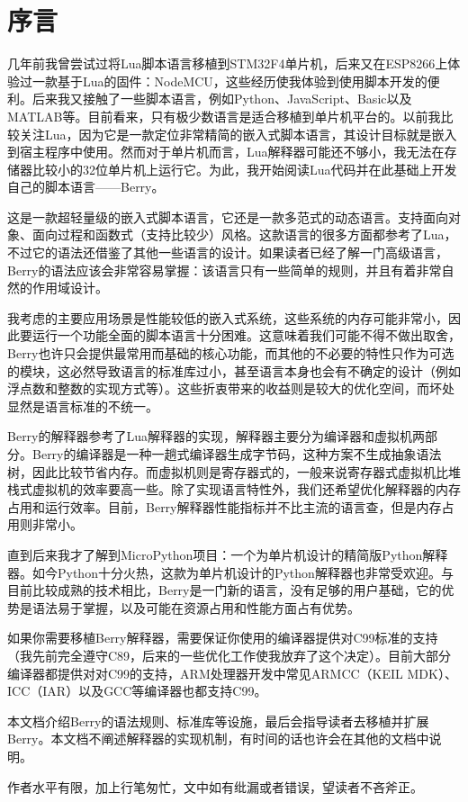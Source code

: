 \chapter*{序\quad 言}

\pagestyle{empty}
\thispagestyle{empty}

几年前我曾尝试过将Lua脚本语言移植到STM32F4单片机，后来又在ESP8266上体验过一款基于Lua的固件：NodeMCU，这些经历使我体验到使用脚本开发的便利。后来我又接触了一些脚本语言，例如Python、JavaScript、Basic以及MATLAB等。目前看来，只有极少数语言是适合移植到单片机平台的。以前我比较关注Lua，因为它是一款定位非常精简的嵌入式脚本语言，其设计目标就是嵌入到宿主程序中使用。然而对于单片机而言，Lua解释器可能还不够小，我无法在存储器比较小的32位单片机上运行它。为此，我开始阅读Lua代码并在此基础上开发自己的脚本语言------Berry。

这是一款超轻量级的嵌入式脚本语言，它还是一款多范式的动态语言。支持面向对象、面向过程和函数式（支持比较少）风格。这款语言的很多方面都参考了Lua，不过它的语法还借鉴了其他一些语言的设计。如果读者已经了解一门高级语言，Berry的语法应该会非常容易掌握：该语言只有一些简单的规则，并且有着非常自然的作用域设计。

我考虑的主要应用场景是性能较低的嵌入式系统，这些系统的内存可能非常小，因此要运行一个功能全面的脚本语言十分困难。这意味着我们可能不得不做出取舍，Berry也许只会提供最常用而基础的核心功能，而其他的不必要的特性只作为可选的模块，这必然导致语言的标准库过小，甚至语言本身也会有不确定的设计（例如浮点数和整数的实现方式等）。这些折衷带来的收益则是较大的优化空间，而坏处显然是语言标准的不统一。

Berry的解释器参考了Lua解释器的实现，解释器主要分为编译器和虚拟机两部分。Berry的编译器是一种一趟式编译器生成字节码，这种方案不生成抽象语法树，因此比较节省内存。而虚拟机则是寄存器式的，一般来说寄存器式虚拟机比堆栈式虚拟机的效率要高一些。除了实现语言特性外，我们还希望优化解释器的内存占用和运行效率。目前，Berry解释器性能指标并不比主流的语言查，但是内存占用则非常小。

直到后来我才了解到MicroPython项目：一个为单片机设计的精简版Python解释器。如今Python十分火热，这款为单片机设计的Python解释器也非常受欢迎。与目前比较成熟的技术相比，Berry是一门新的语言，没有足够的用户基础，它的优势是语法易于掌握，以及可能在资源占用和性能方面占有优势。

如果你需要移植Berry解释器，需要保证你使用的编译器提供对C99标准的支持（我先前完全遵守C89，后来的一些优化工作使我放弃了这个决定）。目前大部分编译器都提供对对C99的支持，ARM处理器开发中常见ARMCC（KEIL MDK）、ICC（IAR）以及GCC等编译器也都支持C99。

本文档介绍Berry的语法规则、标准库等设施，最后会指导读者去移植并扩展Berry。本文档不阐述解释器的实现机制，有时间的话也许会在其他的文档中说明。

作者水平有限，加上行笔匆忙，文中如有纰漏或者错误，望读者不吝斧正。


